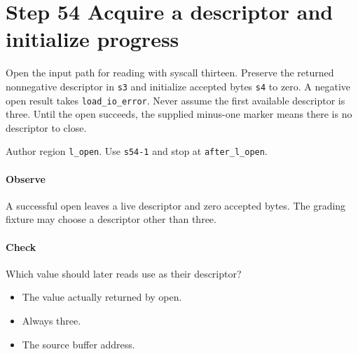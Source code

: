 \section{Step 54 Acquire a descriptor and initialize progress}\label{pcm-wav-s54}
Open the input path for reading with syscall thirteen. Preserve the returned nonnegative descriptor in \texttt{s3} and initialize accepted bytes \texttt{s4} to zero. A negative open result takes \texttt{load\_io\_error}. Never assume the first available descriptor is three. Until the open succeeds, the supplied minus-one marker means there is no descriptor to close.

Author region \texttt{l\_open}. Use \texttt{s54-1} and stop at \texttt{after\_l\_open}.

\paragraph{Observe} A successful open leaves a live descriptor and zero accepted bytes. The grading fixture may choose a descriptor other than three.

\paragraph{Check} Which value should later reads use as their descriptor?
\begin{itemize}
  \item[A.] The value actually returned by open.
  \item[B.] Always three.
  \item[C.] The source buffer address.
\end{itemize}
